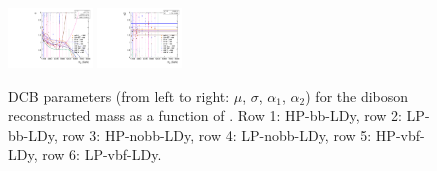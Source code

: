 \begin{figure}[htbp]
  \includegraphics[width=0.2\textwidth]{fig/analysis/paramSignalShape_allSig_MVV_LP_vbf_DEtaLo_ALPHA1.pdf}
  \includegraphics[width=0.2\textwidth]{fig/analysis/paramSignalShape_allSig_MVV_LP_vbf_DEtaLo_ALPHA2.pdf}\\
  \caption{
    DCB parameters (from left to right: $\mu$, $\sigma$, $\alpha_1$, $\alpha_2$) for the diboson reconstructed mass \MVV as a function of \MX.
    Row 1: HP-bb-LDy, row 2: LP-bb-LDy, row 3: HP-nobb-LDy, row 4: LP-nobb-LDy, row 5: HP-vbf-LDy, row 6: LP-vbf-LDy.
  }
  \label{fig:MVVShapes_NonVBF_LDy_Run2}
\end{figure}

